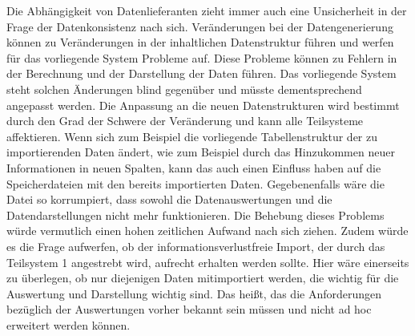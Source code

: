     Die Abhängigkeit von Datenlieferanten zieht immer auch eine Unsicherheit in der Frage der Datenkonsistenz
    nach sich. Veränderungen bei der Datengenerierung können zu Veränderungen in der inhaltlichen Datenstruktur führen und
    werfen für das vorliegende System Probleme auf.
    Diese Probleme können zu Fehlern in der Berechnung und der Darstellung der Daten führen. 
    Das vorliegende System steht solchen Änderungen blind gegenüber und müsste dementsprechend angepasst werden. 
    Die Anpassung an die neuen Datenstrukturen wird bestimmt durch den Grad der Schwere der Veränderung und kann alle Teilsysteme affektieren. 
    Wenn sich zum Beispiel die vorliegende Tabellenstruktur der zu importierenden Daten ändert, wie zum Beispiel 
    durch das Hinzukommen neuer Informationen in neuen Spalten, kann das auch einen Einfluss haben 
    auf die Speicherdateien mit den bereits importierten Daten. Gegebenenfalls wäre die Datei so korrumpiert,
    dass sowohl die Datenauswertungen und die Datendarstellungen nicht mehr funktionieren. Die Behebung dieses Problems 
    würde vermutlich einen hohen zeitlichen Aufwand nach sich ziehen. Zudem würde es die Frage aufwerfen, 
    ob der informationsverlustfreie Import, der durch das Teilsystem 1 angestrebt wird, aufrecht erhalten werden sollte.
    Hier wäre einerseits zu überlegen, ob nur diejenigen Daten mitimportiert werden, die wichtig für die Auswertung
    und Darstellung wichtig sind. Das heißt, das die Anforderungen bezüglich der Auswertungen vorher bekannt sein müssen und
    nicht ad hoc erweitert werden können.

